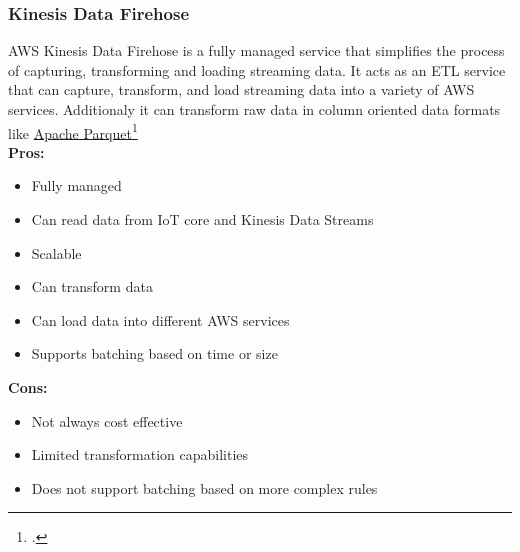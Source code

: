         \subsubsection{Kinesis Data Firehose}
        \label{aws:kinesis-data-firehose}
        AWS Kinesis Data Firehose is a fully managed service that simplifies the process of capturing, transforming and loading streaming data.
        It acts as an ETL service that can capture, transform, and load streaming data into a variety of AWS services.
        Additionaly it can transform raw data in column oriented data formats like \href{https://parquet.apache.org/}{Apache Parquet}\footcite{site:apache-parquet}\\
        \textbf{Pros:}
        \begin{itemize}
            \item Fully managed
            \item Can read data from IoT core and Kinesis Data Streams
            \item Scalable
            \item Can transform data
            \item Can load data into different AWS services
            \item Supports batching based on time or size
        \end{itemize}
        \textbf{Cons:}
        \begin{itemize}
            \item Not always cost effective
            \item Limited transformation capabilities
            \item Does not support batching based on more complex rules
        \end{itemize}
        
